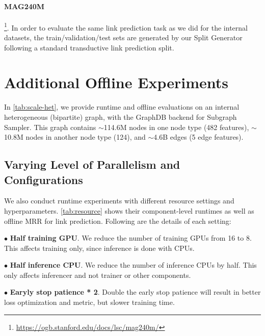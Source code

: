 \paragraph{MAG240M}\footnote{\url{https://ogb.stanford.edu/docs/lsc/mag240m/}}. 
In order to evaluate the same link prediction task as we did for the internal datasets, the train/validation/test sets are generated by our Split Generator following a standard transductive link prediction split.

\section{Additional Offline Experiments}
\label{appx:experiments}

In \cref{tab:scale-het}, we provide runtime and offline evaluations on an internal heterogeneous (bipartite) graph, with the GraphDB backend for Subgraph Sampler. This graph contains $\sim$114.6M nodes in one node type (482 features), $\sim$10.8M nodes in another node type (124), and $\sim$4.6B edges (5 edge features).


\subsection{Varying Level of Parallelism and Configurations}

We also conduct runtime experiments with different resource settings and hyperparameters. \cref{tab:resource} shows their component-level runtimes as well as offline MRR for link prediction. Following are the details of each setting:

\noindent $\bullet$ \textbf{Half training GPU}. We reduce the number of training GPUs from 16 to 8. This affects training only, since inference is done with CPUs.

\noindent $\bullet$ \textbf{Half inference CPU}. We reduce the number of inference CPUs by half. This only affects inferencer and not trainer or other components.

\noindent $\bullet$ \textbf{Earyly stop patience * 2}. Double the early stop patience will result in better loss optimization and metric, but slower training time.

